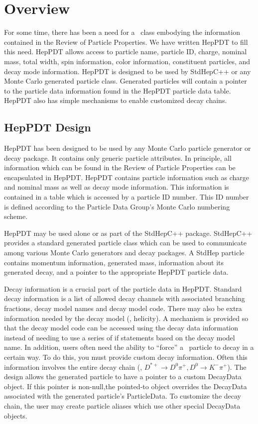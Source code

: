 
\section{Overview}

For some time, there has been a need for a \cpp\ class embodying the
information contained in the Review of Particle Properties\cite{pdg}.
We have written HepPDT to fill this need.  
HepPDT allows access
to particle name, particle ID, charge, nominal mass,  total width,
spin information, color information, constituent particles, and
decay mode information.
HepPDT is designed to be used by StdHepC++\cite{stdhep}
or any Monte Carlo generated particle class. 
Generated particles will contain a
pointer to the particle data information found in the HepPDT
particle data table.  
HepPDT also has simple mechanisms to enable customized decay chains.

\subsection{HepPDT Design}

HepPDT has been designed to be used by any Monte Carlo particle generator
or decay package.  It contains only generic particle attributes.
In principle, all information which can be found in
the Review of Particle Properties\cite{pdg} can be encapsulated in HepPDT.
HepPDT contains particle information such as charge and nominal mass
as well as decay mode information.  This information is contained
in a table which is accessed by a particle ID number.  This ID number
is defined according to the Particle Data Group's
Monte Carlo numbering scheme\cite{newscheme}.  

HepPDT may be used alone or as part of the StdHepC++\cite{stdhep} package.
StdHepC++ provides a standard generated particle class which can be used
to communicate among various Monte Carlo generators and decay packages.
A StdHep particle contains momentum information, generated mass, 
information about its generated decay, and 
a pointer to the appropriate HepPDT particle data.

Decay information is a crucial part of the particle data in HepPDT.
Standard decay information is a list of allowed decay channels with
associated branching fractions, decay model names and decay model code.  
There may also be
extra information needed by the decay model (\eg, helicity).
A mechanism is provided so that the decay model code can be accessed
using the decay data information instead of needing to use
a series of if statements based on the decay model name.
In addition, users often need the ability to ``force'' a \
particle to decay in a certain way.
To do this, you must provide custom decay information.  Often this information
involves the entire decay chain (\eg, $D^{*+} \rightarrow D^0 \pi^+, 
D^0 \rightarrow K^- \pi^+$).  The design allows the generated
particle to have a pointer to a custom DecayData object.  
If this pointer is non-null,the pointed-to
object overrides the DecayData associated with the generated
particle's ParticleData. 
To customize the decay chain, the user may create
particle aliases which use other special DecayData objects.

